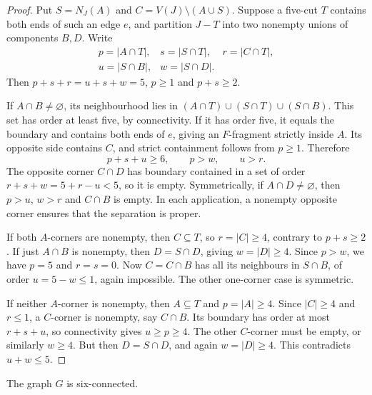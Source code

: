 \begin{proof}
Put $S=N_J(A)$ and $C=V(J)\setminus(A\cup S)$. Suppose a five-cut
$T$ contains both ends of such an edge $e$, and partition $J-T$
into two nonempty unions of components $B,D$. Write
\[
 \begin{array}{lll}
 p=|A\cap T|,&s=|S\cap T|,&r=|C\cap T|,\\
 u=|S\cap B|,&w=|S\cap D|.&
 \end{array}
\]
Then $p+s+r=u+s+w=5$, $p\geq1$ and $p+s\geq2$.

If $A\cap B\ne\varnothing$, its neighbourhood lies in
$(A\cap T)\cup(S\cap T)\cup(S\cap B)$. This set has order at least
five, by connectivity. If it has order five, it equals the boundary
and contains both ends of $e$, giving an $F$-fragment strictly
inside $A$. Its opposite side contains
$C$, and strict containment follows from $p\geq1$. Therefore
\[
 p+s+u\geq6,\qquad p>w,\qquad u>r.
\]
The opposite corner $C\cap D$ has boundary contained in a set of
order $r+s+w=5+r-u<5$, so it is empty. Symmetrically, if
$A\cap D\ne\varnothing$, then $p>u$, $w>r$ and $C\cap B$ is empty.
In each application, a nonempty opposite corner ensures that
the separation is proper.

If both $A$-corners are nonempty, then $C\subseteq T$, so
$r=|C|\geq4$, contrary to $p+s\geq2$. If just $A\cap B$ is
nonempty, then $D=S\cap D$, giving $w=|D|\geq4$. Since $p>w$,
we have $p=5$ and $r=s=0$. Now $C=C\cap B$ has all its neighbours
in $S\cap B$, of order $u=5-w\leq1$, again impossible. The other
one-corner case is symmetric.

If neither $A$-corner is nonempty, then $A\subseteq T$ and
$p=|A|\geq4$. Since $|C|\geq4$ and $r\leq1$, a $C$-corner is
nonempty, say $C\cap B$. Its boundary has order at most $r+s+u$,
so connectivity gives $u\geq p\geq4$. The other $C$-corner must
be empty, or similarly $w\geq4$. But then $D=S\cap D$, and again
$w=|D|\geq4$. This contradicts $u+w\leq5$.
\end{proof}

\begin{lemma}\label{gl:six-connected}
The graph $G$ is six-connected.
\end{lemma}

